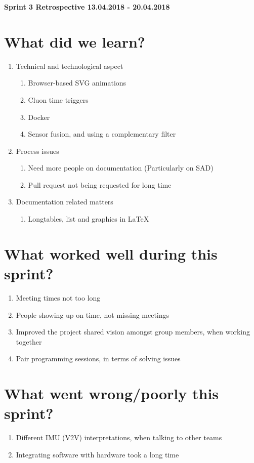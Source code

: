 \documentclass[11pt]{article}
\begin{document}
\textbf{\LARGE  Sprint 3 Retrospective 13.04.2018 - 20.04.2018}

\section*{What did we learn?}
\begin{enumerate}
	\item Technical and technological aspect
		\begin{enumerate} 
			\item Browser-based SVG animations
			\item Cluon time triggers
			\item Docker
			\item Sensor fusion, and using a complementary filter
		\end{enumerate} 
	\item Process issues
		\begin{enumerate} 
			\item Need more people on documentation (Particularly on SAD)
			\item Pull request not being requested for long time
		\end{enumerate}		
	\item Documentation related matters
		\begin{enumerate} 
			\item Longtables, list and graphics in LaTeX
		\end{enumerate}	
\end{enumerate} 

\section*{What worked well during this sprint?}
\begin{enumerate}
	\item Meeting times not too long 
	\item People showing up on time, not missing meetings
	\item Improved the project shared vision amongst group members, when working together
	\item Pair programming sessions, in terms of solving issues
\end{enumerate} 

\section*{What went wrong/poorly this sprint?}
\begin{enumerate}
	\item Different IMU (V2V) interpretations, when talking to other teams
	\item Integrating software with hardware took a long time
\end{enumerate} 
\end{document}
